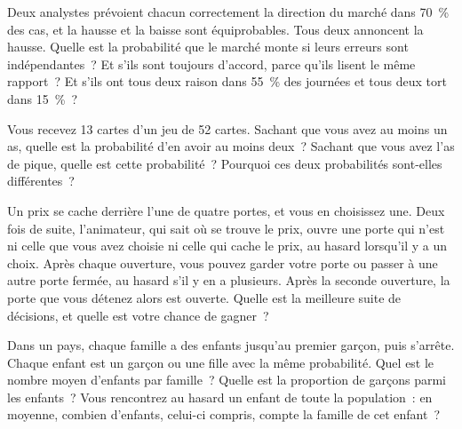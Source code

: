 \begin{question}\label{iq:iv1:conditional-probability-and-bayes:27}
Deux analystes prévoient chacun correctement la direction du marché dans 70~\% des cas, et la hausse et la baisse sont équiprobables. Tous deux annoncent la hausse. Quelle est la probabilité que le marché monte si leurs erreurs sont indépendantes~? Et s'ils sont toujours d'accord, parce qu'ils lisent le même rapport~? Et s'ils ont tous deux raison dans 55~\% des journées et tous deux tort dans 15~\%~?
\end{question}

\begin{question}\label{iq:iv1:conditional-probability-and-bayes:28}
Vous recevez 13 cartes d'un jeu de 52 cartes. Sachant que vous avez au moins un as, quelle est la probabilité d'en avoir au moins deux~? Sachant que vous avez l'as de pique, quelle est cette probabilité~? Pourquoi ces deux probabilités sont-elles différentes~?
\end{question}

\begin{question}\label{iq:iv1:conditional-probability-and-bayes:29}
Un prix se cache derrière l'une de quatre portes, et vous en choisissez une. Deux fois de suite, l'animateur, qui sait où se trouve le prix, ouvre une porte qui n'est ni celle que vous avez choisie ni celle qui cache le prix, au hasard lorsqu'il y a un choix. Après chaque ouverture, vous pouvez garder votre porte ou passer à une autre porte fermée, au hasard s'il y en a plusieurs. Après la seconde ouverture, la porte que vous détenez alors est ouverte. Quelle est la meilleure suite de décisions, et quelle est votre chance de gagner~?
\end{question}

\begin{question}\label{iq:iv1:conditional-probability-and-bayes:30}
Dans un pays, chaque famille a des enfants jusqu'au premier garçon, puis s'arrête. Chaque enfant est un garçon ou une fille avec la même probabilité. Quel est le nombre moyen d'enfants par famille~? Quelle est la proportion de garçons parmi les enfants~? Vous rencontrez au hasard un enfant de toute la population~: en moyenne, combien d'enfants, celui-ci compris, compte la famille de cet enfant~?
\end{question}

